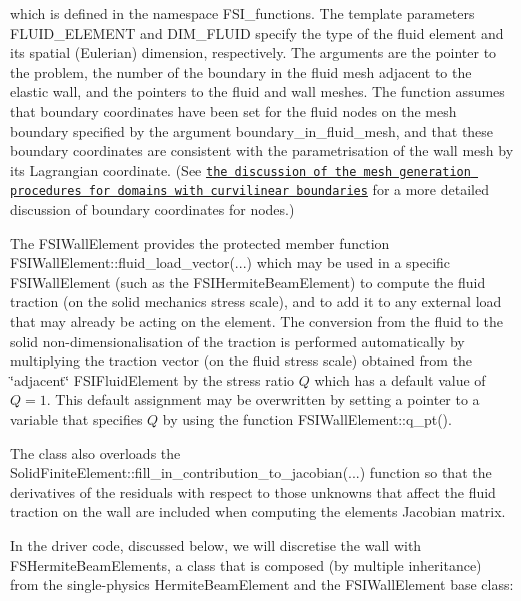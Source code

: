 which is defined in the namespace {\ttfamily F\+S\+I\+\_\+functions}. The template parameters {\ttfamily F\+L\+U\+I\+D\+\_\+\+E\+L\+E\+M\+E\+NT} and {\ttfamily D\+I\+M\+\_\+\+F\+L\+U\+ID} specify the type of the fluid element and its spatial (Eulerian) dimension, respectively. The arguments are the pointer to the problem, the number of the boundary in the fluid mesh adjacent to the elastic wall, and the pointers to the fluid and wall meshes. The function assumes that boundary coordinates have been set for the fluid nodes on the mesh boundary specified by the argument {\ttfamily boundary\+\_\+in\+\_\+fluid\+\_\+mesh}, and that these boundary coordinates are consistent with the parametrisation of the wall mesh by its Lagrangian coordinate. (See \href{../../../poisson/fish_poisson2/html/index.html#boundary_coords}{\tt the discussion of the mesh generation procedures for domains with curvilinear boundaries} for a more detailed discussion of boundary coordinates for nodes.)

The {\ttfamily F\+S\+I\+Wall\+Element} provides the protected member function {\ttfamily F\+S\+I\+Wall\+Element\+::fluid\+\_\+load\+\_\+vector}(...) which may be used in a specific {\ttfamily F\+S\+I\+Wall\+Element} (such as the {\ttfamily F\+S\+I\+Hermite\+Beam\+Element}) to compute the fluid traction (on the solid mechanics stress scale), and to add it to any external load that may already be acting on the element. The conversion from the fluid to the solid non-\/dimensionalisation of the traction is performed automatically by multiplying the traction vector (on the fluid stress scale) obtained from the \char`\"{}adjacent\char`\"{} {\ttfamily F\+S\+I\+Fluid\+Element} by the stress ratio $ Q $ which has a default value of $ Q=1. $ This default assignment may be overwritten by setting a pointer to a variable that specifies $ Q $ by using the function {\ttfamily F\+S\+I\+Wall\+Element\+::q\+\_\+pt()}.

The class also overloads the {\ttfamily Solid\+Finite\+Element\+::fill\+\_\+in\+\_\+contribution\+\_\+to\+\_\+jacobian}(...) function so that the derivatives of the residuals with respect to those unknowns that affect the fluid traction on the wall are included when computing the element\textquotesingle{}s Jacobian matrix.

In the driver code, discussed below, we will discretise the wall with {\ttfamily F\+S\+Hermite\+Beam\+Elements}, a class that is composed (by multiple inheritance) from the single-\/physics {\ttfamily Hermite\+Beam\+Element} and the {\ttfamily F\+S\+I\+Wall\+Element} base class\+:


